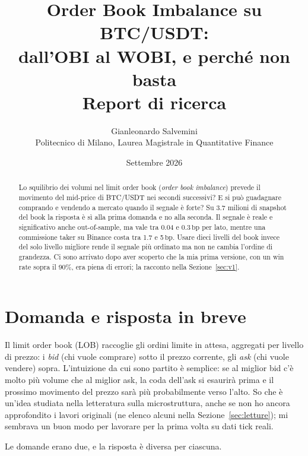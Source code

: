 \documentclass[a4paper,11pt]{article}
\title{Order Book Imbalance su BTC/USDT:\\
dall'OBI al WOBI, e perché non basta\\[4pt]
\large Report di ricerca}
\author{Gianleonardo Salvemini\\[2pt]
\small Politecnico di Milano, Laurea Magistrale in Quantitative Finance}
\date{Settembre 2026}
\newcommand{\bp}{\ensuremath{\,\mathrm{bp}}}
\begin{document}
\maketitle

\begin{abstract}
\noindent
Lo squilibrio dei volumi nel limit order book (\emph{order book imbalance}) prevede il movimento
del mid-price di BTC/USDT nei secondi successivi? E si può guadagnare comprando e vendendo a
mercato quando il segnale è forte? Su 3.7 milioni di snapshot del book la risposta è sì alla
prima domanda e no alla seconda. Il segnale è reale e significativo anche out-of-sample, ma vale
tra 0.04 e 0.3\bp{} per lato, mentre una commissione taker su Binance costa tra 1.7 e 5\bp{}.
Usare dieci livelli del book invece del solo livello migliore rende il segnale più ordinato ma
non ne cambia l'ordine di grandezza. Ci sono arrivato dopo aver scoperto che la mia prima
versione, con un win rate sopra il 90\%, era piena di errori; la racconto nella
Sezione~\ref{sec:v1}.
\end{abstract}

\tableofcontents
\newpage

\section{Domanda e risposta in breve}
\label{sec:intro}

Il limit order book (LOB) raccoglie gli ordini limite in attesa, aggregati per livello di
prezzo: i \emph{bid} (chi vuole comprare) sotto il prezzo corrente, gli \emph{ask} (chi vuole
vendere) sopra. L'intuizione da cui sono partito è semplice: se al miglior bid c'è molto più
volume che al miglior ask, la coda dell'ask si esaurirà prima e il prossimo movimento del prezzo
sarà più probabilmente verso l'alto. So che è un'idea studiata nella letteratura sulla
microstruttura, anche se non ho ancora approfondito i lavori originali (ne elenco alcuni nella
Sezione~\ref{sec:letture}); mi sembrava un buon modo per lavorare per la prima volta su dati tick
reali.

Le domande erano due, e la risposta è diversa per ciascuna.
\end{document}
